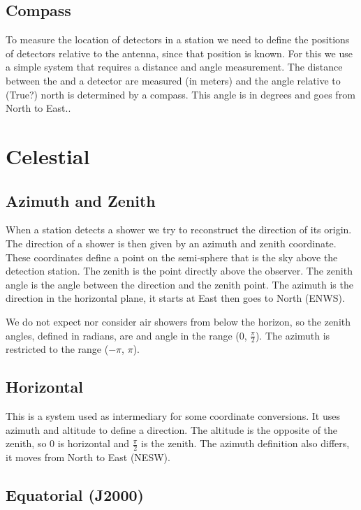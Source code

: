 \subsection{Compass}

To measure the location of detectors in a station we need to define the
positions of detectors relative to the \gps antenna, since that position
is known. For this we use a simple system that requires a distance and
angle measurement. The distance between the \gps and a detector are
measured (in meters) and the angle relative to (True?) north is
determined by a compass. This angle is in degrees and goes from North to
East..


\section{Celestial}

\subsection{Azimuth and Zenith}

When a station detects a shower we try to reconstruct the direction of
its origin. The direction of a shower is then given by an azimuth and
zenith coordinate. These coordinates define a point on the semi-sphere
that is the sky above the detection station. The zenith is the point
directly above the observer. The zenith angle is the angle between the
direction and the zenith point. The azimuth is the direction in the
horizontal plane, it starts at East then goes to North (ENWS).

We do not expect nor consider air showers from below the horizon, so the
zenith angles, defined in radians, are and angle in the range (0,
$\frac{\pi}{2}$). The azimuth is restricted to the range ($-\pi$, $\pi$).


\subsection{Horizontal}

This is a system used as intermediary for some coordinate conversions.
It uses azimuth and altitude to define a direction. The altitude is the
opposite of the zenith, so 0 is horizontal and $\frac{\pi}{2}$ is the
zenith. The azimuth definition also differs, it moves from North to East
(NESW).


\subsection{Equatorial (J2000)}

